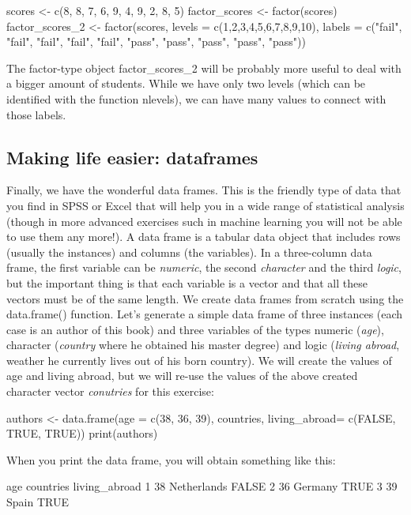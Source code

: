 \begin{exampler}
scores <- c(8, 8, 7, 6, 9, 4, 9, 2, 8, 5)
factor_scores <- factor(scores)
factor_scores_2 <- factor(scores, levels = c(1,2,3,4,5,6,7,8,9,10), labels = c("fail", "fail", "fail", "fail", "fail", "pass", "pass", "pass", "pass", "pass"))
\end{exampler}

The factor-type object factor\_scores\_2 will be probably more useful to deal with a bigger amount of students. While we have only two levels (which can be identified with the function nlevels), we can have many values to connect with those labels.


\subsection{Making life easier: dataframes}

Finally, we have the wonderful data frames. This is the friendly type of data that you find in SPSS or Excel that will help you in a wide range of statistical analysis (though in more advanced exercises such in machine learning you will not be able to use them any more!).  A data frame is a tabular data object that includes rows (usually the instances) and columns (the variables). In a three-column data frame, the first variable can be \emph{numeric}, the second \emph{character} and the third \emph{logic}, but the important thing is that each variable is a vector and that all these vectors must be of the same length. We create data frames from scratch using the data.frame() function.  Let’s generate a simple data frame of three instances (each case is an author of this book) and three variables of the types numeric (\emph{age}), character (\emph{country} where he obtained his master degree) and logic (\emph{living abroad}, weather he currently lives out of his born country). We will create the values of age and living abroad, but we will re-use the values of the above created character vector \emph{conutries} for this exercise:

\begin{exampler}
authors <- data.frame(age = c(38, 36, 39), countries, living_abroad= c(FALSE, TRUE, TRUE))
print(authors)
\end{exampler}

When you print the data frame, you will obtain something like this:

\begin{exampler}
  	age   	countries 		living_abroad
1 	 38 	Netherlands         	FALSE
2 	 36 	Germany         	TRUE
3 	 39    	Spain          		TRUE
\end{exampler}

